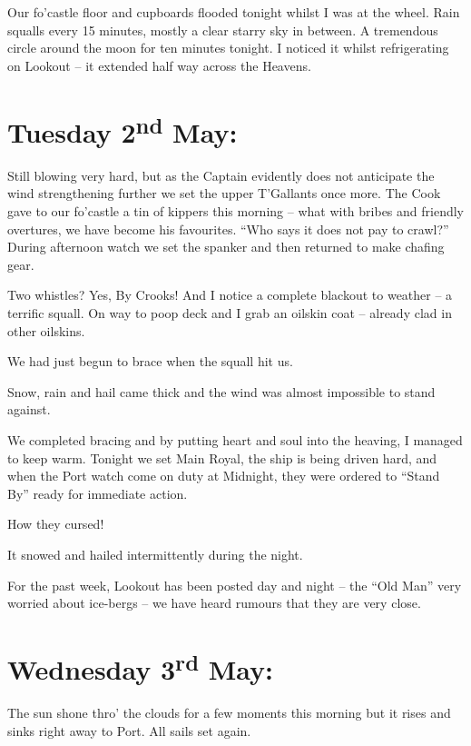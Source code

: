 \documentclass[
  11pt,
  msmallroyalvopaper
]{memoir}
\begin{document}
Our fo'castle floor and cupboards flooded tonight whilst I was at the
wheel. Rain squalls every 15 minutes, mostly a clear starry sky in
between. A tremendous circle around the moon for ten minutes tonight. I
noticed it whilst refrigerating on Lookout -- it extended half way
across the Heavens.

\hypertarget{tuesday-2nd-may}{%
\section{\texorpdfstring{Tuesday 2\textsuperscript{nd}
May:}{Tuesday 2nd May:}}\label{tuesday-2nd-may}}

Still blowing very hard, but as the Captain evidently does not
anticipate the wind strengthening further we set the upper T'Gallants
once more. The Cook gave to our fo'castle a tin of kippers this morning
-- what with bribes and friendly overtures, we have become his
favourites. ``Who says it does not pay to crawl?'' During afternoon
watch we set the spanker and then returned to make chafing gear.

Two whistles? Yes, By Crooks! And I notice a complete blackout to
weather -- a terrific squall. On way to poop deck and I grab an oilskin
coat -- already clad in other oilskins.

We had just begun to brace when the squall hit us.

Snow, rain and hail came thick and the wind was almost impossible to
stand against.

We completed bracing and by putting heart and soul into the heaving, I
managed to keep warm. Tonight we set Main Royal, the ship is being
driven hard, and when the Port watch come on duty at Midnight, they were
ordered to ``Stand By'' ready for immediate action.

How they cursed!

It snowed and hailed intermittently during the night.

For the past week, Lookout has been posted day and night -- the ``Old
Man'' very worried about ice-bergs -- we have heard rumours that they
are very close.

\hypertarget{wednesday-3rd-may}{%
\section{\texorpdfstring{Wednesday 3\textsuperscript{rd}
May:}{Wednesday 3rd May:}}\label{wednesday-3rd-may}}

The sun shone thro' the clouds for a few moments this morning but it
rises and sinks right away to Port. All sails set again.
\end{document}
